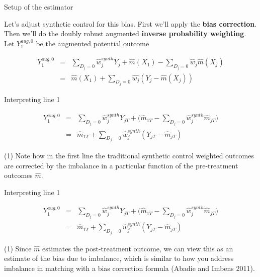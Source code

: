 \documentclass{beamer}
\begin{document}
\begin{frame}{Setup of the estimator}

Let's adjust synthetic control for this bias.  First we'll apply the \textbf{bias correction}.  Then we'll do the doubly robust augmented \textbf{inverse probability weighting}. Let $Y_1^{aug,0}$ be the augmented potential outcome

\begin{eqnarray*}
Y_1^{aug,0} &=& \sum_{D_j=0} \widehat{w}_j^{synth} Y_{j} + \widehat{m}(X_1) - \sum_{D_j=0} \widehat{w}_j \widehat{m}(X_j) \\
&=& \widehat{m}(X_1) + \sum_{D_j=0} \widehat{w_j}(Y_j - \widehat{m}(X_j))
\end{eqnarray*}

\end{frame}


\begin{frame}{Interpreting line 1}

\begin{eqnarray*}
Y_1^{aug,0} &=& \sum_{D_j=0} \widehat{w}_j^{synth} Y_{jT} + \bigg (\widehat{m}_{1T} - \sum_{D_j=0} \widehat{w}_j^{synth}\widehat{m}_{jT} \bigg ) \\
&=& \widehat{m}_{1T} + \sum_{D_j=0} \widehat{w}_j^{synth} (Y_{jT} - \widehat{m}_{jT})
\end{eqnarray*}

(1) Note how in the first line the traditional synthetic control weighted outcomes are corrected by the imbalance in a particular function of the pre-treatment outcomes $\widehat{m}$. 
\end{frame}




\begin{frame}{Interpreting line 1}

\begin{eqnarray*}
Y_1^{aug,0}  &=& \sum_{D_j=0} \widehat{w}_j^{synth} Y_{jT} + \bigg (\widehat{m}_{1T} - \sum_{D_j=0} \widehat{w}_j^{synth}\widehat{m}_{jT} \bigg ) \\
&=& \widehat{m}_{1T} + \sum_{D_j=0} \widehat{w}_j^{synth} (Y_{jT} - \widehat{m}_{jT})
\end{eqnarray*}

(1) Since $\widehat{m}$ estimates the post-treatment outcome, we can view this as an estimate of the bias due to imbalance, which is similar to how you address imbalance in matching with a bias correction formula (Abadie and Imbens 2011). 

\end{frame}
\end{document}
